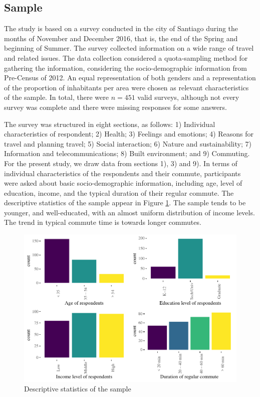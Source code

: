 \documentclass[]{elsarticle} %
\makeatletter
\def\maxwidth{\ifdim\Gin@nat@width>\linewidth\linewidth
\else\Gin@nat@width\fi}
\let\Oldincludegraphics\includegraphics
\renewcommand{\includegraphics}[1]{\Oldincludegraphics[width=\maxwidth]{#1}}
\makeatother
\begin{document}
\hypertarget{sample}{%
\subsection{Sample}\label{sample}}

The study is based on a survey conducted in the city of Santiago during
the months of November and December 2016, that is, the end of the Spring
and beginning of Summer. The survey collected information on a wide
range of travel and related issues. The data collection considered a
quota-sampling method for gathering the information, considering the
socio-demographic information from Pre-Census of 2012. An equal
representation of both genders and a representation of the proportion of
inhabitants per area were chosen as relevant characteristics of the
sample. In total, there were \(n=451\) valid surveys, although not every
survey was complete and there were missing responses for some answers.

The survey was structured in eight sections, as follows: 1) Individual
characteristics of respondent; 2) Health; 3) Feelings and emotions; 4)
Reasons for travel and planning travel; 5) Social interaction; 6) Nature
and sustainability; 7) Information and telecommunications; 8) Built
environment; and 9) Commuting. For the present study, we draw data from
sections 1), 3) and 9). In terms of individual characteristics of the
respondents and their commute, participants were asked about basic
socio-demographic information, including age, level of education,
income, and the typical duration of their regular commute. The
descriptive statistics of the sample appear in Figure
\ref{fig:descriptive-statistics}. The sample tends to be younger, and
well-educated, with an almost uniform distribution of income levels. The
trend in typical commute time is towards longer commutes.

\begin{figure}
\centering
\includegraphics{Dissonance_Santiago_v2_files/figure-latex/plot-descriptive-statistics-1.pdf}
\caption{\label{fig:descriptive-statistics}Descriptive statistics of the
sample}
\end{figure}
\end{document}
